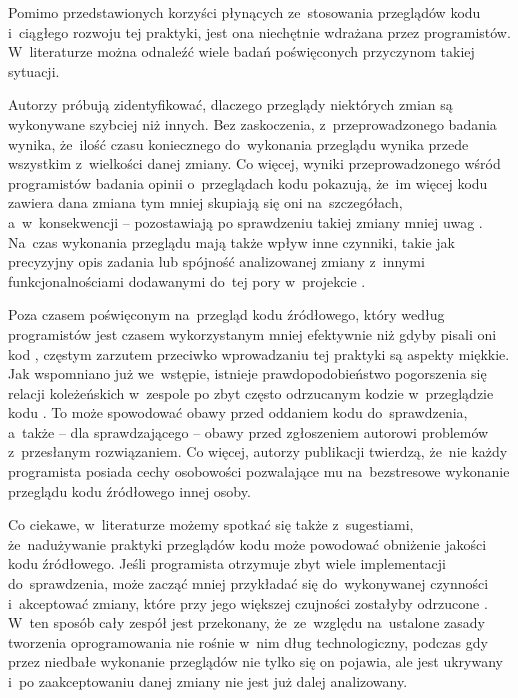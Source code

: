 \documentclass[twoside]{praca}
\begin{document}
Pomimo przedstawionych korzyści płynących ze~stosowania przeglądów kodu i~ciągłego rozwoju tej praktyki, jest ona niechętnie wdrażana przez programistów. W~literaturze można odnaleźć wiele badań poświęconych przyczynom takiej sytuacji.

Autorzy \cite{ram2018makes} próbują zidentyfikować, dlaczego przeglądy niektórych zmian są wykonywane szybciej niż innych. Bez zaskoczenia, z~przeprowadzonego badania wynika, że~ilość czasu koniecznego do~wykonania przeglądu wynika przede wszystkim z~wielkości danej zmiany. Co więcej, wyniki przeprowadzonego wśród programistów badania opinii o~przeglądach kodu pokazują, że~im więcej kodu zawiera dana zmiana tym mniej skupiają się oni na~szczegółach, a~w~konsekwencji -- pozostawiają po sprawdzeniu takiej zmiany mniej uwag \cite{dos2018investigating}. Na~czas wykonania przeglądu mają także wpływ inne czynniki, takie jak precyzyjny opis zadania lub spójność analizowanej zmiany z~innymi funkcjonalnościami dodawanymi do~tej pory w~projekcie \cite{ram2018makes}. 

\pagebreak

Poza czasem poświęconym na~przegląd kodu źródłowego, który według programistów jest czasem wykorzystanym mniej efektywnie niż gdyby pisali oni kod \cite{cohen2006best}, częstym zarzutem przeciwko wprowadzaniu tej praktyki są aspekty miękkie. Jak wspomniano już we~wstępie, istnieje prawdopodobieństwo pogorszenia się relacji koleżeńskich w~zespole po zbyt często odrzucanym kodzie w~przeglądzie kodu \cite{baum2016factors}. To może spowodować obawy przed oddaniem kodu do~sprawdzenia, a~także -- dla sprawdzającego -- obawy przed zgłoszeniem autorowi problemów z~przesłanym rozwiązaniem. Co więcej, autorzy publikacji \cite{da2007does} twierdzą, że~nie każdy programista posiada cechy osobowości pozwalające mu na~bezstresowe wykonanie przeglądu kodu źródłowego innej osoby.

Co ciekawe, w~literaturze możemy spotkać się także z~sugestiami, że~nadużywanie praktyki przeglądów kodu może powodować obniżenie jakości kodu źródłowego. Jeśli programista otrzymuje zbyt wiele implementacji do~sprawdzenia, może zacząć mniej przykładać się do~wykonywanej czynności i~akceptować zmiany, które przy jego większej czujności zostałyby odrzucone \cite{mcintosh2014impact}. W~ten sposób cały zespół jest przekonany, że~ze~względu na~ustalone zasady tworzenia oprogramowania nie rośnie w~nim dług technologiczny, podczas gdy przez niedbałe wykonanie przeglądów nie tylko się on pojawia, ale jest ukrywany i~po zaakceptowaniu danej zmiany nie jest już dalej analizowany.
\end{document}
